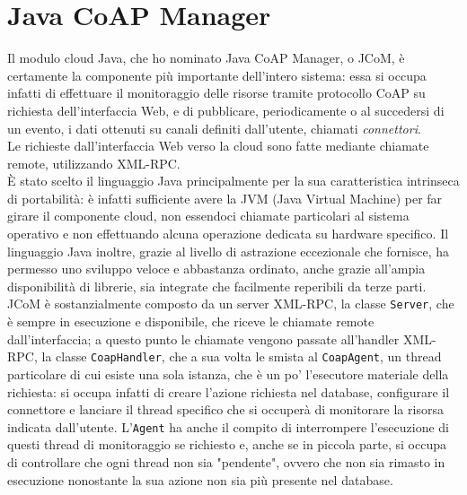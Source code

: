 \section{Java CoAP Manager}
Il modulo cloud Java, che ho nominato Java CoAP Manager, o JCoM, è certamente la componente più importante dell'intero sistema: essa si occupa infatti di effettuare il monitoraggio delle risorse tramite protocollo CoAP su richiesta dell'interfaccia Web, e di pubblicare, periodicamente o al succedersi di un evento, i dati ottenuti su canali definiti dall'utente, chiamati \textit{connettori}.
\\Le richieste dall'interfaccia Web verso la cloud sono fatte mediante chiamate remote, utilizzando XML-RPC.
\\È stato scelto il linguaggio Java principalmente per la sua caratteristica intrinseca di portabilità: è infatti sufficiente avere la JVM (Java Virtual Machine) per far girare il componente cloud, non essendoci chiamate particolari al sistema operativo e non effettuando alcuna operazione dedicata su hardware specifico. Il linguaggio Java inoltre, grazie al livello di astrazione eccezionale che fornisce, ha permesso uno sviluppo veloce e abbastanza ordinato, anche grazie all'ampia disponibilità di librerie, sia integrate che facilmente reperibili da terze parti. 
\\JCoM è sostanzialmente composto da un server XML-RPC, la classe {\tt Server}, che è sempre in esecuzione e disponibile, che riceve le chiamate remote dall'interfaccia; a questo punto le chiamate vengono passate all'handler XML-RPC, la classe {\tt CoapHandler}, che a sua volta le smista al {\tt CoapAgent}, un thread particolare di cui esiste una sola istanza, che è un po' l'esecutore materiale della richiesta: si occupa infatti di creare l'azione richiesta nel database, configurare il connettore e lanciare il thread specifico che si occuperà di monitorare la risorsa indicata dall'utente. L'{\tt Agent} ha anche il compito di interrompere l'esecuzione di questi thread di monitoraggio se richiesto e, anche se in piccola parte, si occupa di controllare che ogni thread non sia "pendente", ovvero che non sia rimasto in esecuzione nonostante la sua azione non sia più presente nel database.
